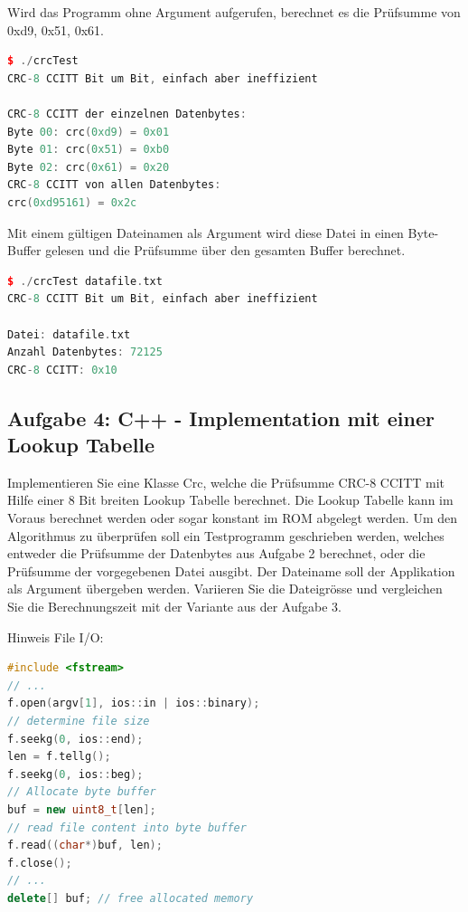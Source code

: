 Wird das Programm ohne Argument aufgerufen, berechnet es die Prüfsumme von {0xd9, 0x51, 0x61}.

\begin{lstlisting}[language=C++, style=C++]
$ ./crcTest
CRC-8 CCITT Bit um Bit, einfach aber ineffizient

CRC-8 CCITT der einzelnen Datenbytes:
Byte 00: crc(0xd9) = 0x01
Byte 01: crc(0x51) = 0xb0
Byte 02: crc(0x61) = 0x20
CRC-8 CCITT von allen Datenbytes:
crc(0xd95161) = 0x2c
\end{lstlisting}

Mit einem gültigen Dateinamen als Argument wird diese Datei in einen Byte-Buffer gelesen und die Prüfsumme über den gesamten Buffer berechnet.

\begin{lstlisting}[language=C++, style=C++]
$ ./crcTest datafile.txt
CRC-8 CCITT Bit um Bit, einfach aber ineffizient

Datei: datafile.txt
Anzahl Datenbytes: 72125
CRC-8 CCITT: 0x10
\end{lstlisting}


\noindent\makebox[\linewidth]{\rule{\paperwidth}{0.4pt}}

\noindent\makebox[\linewidth]{\rule{\paperwidth}{0.4pt}}


\subsection{Aufgabe 4: C++ - Implementation mit einer Lookup Tabelle}
Implementieren Sie eine Klasse Crc, welche die Prüfsumme CRC-8 CCITT mit Hilfe einer 8 Bit breiten Lookup Tabelle berechnet. Die Lookup Tabelle kann im Voraus berechnet werden oder sogar konstant im ROM abgelegt werden. Um den Algorithmus zu überprüfen soll ein Testprogramm geschrieben werden, welches entweder die Prüfsumme der Datenbytes aus Aufgabe 2 berechnet, oder die Prüfsumme der vorgegebenen Datei ausgibt. Der Dateiname soll der Applikation als Argument übergeben werden. Variieren Sie die Dateigrösse und vergleichen Sie die Berechnungszeit mit der Variante aus der Aufgabe 3.

\medskip

Hinweis File I/O:

\begin{lstlisting}[language=C++, style=C++]
#include <fstream>
// ...
f.open(argv[1], ios::in | ios::binary);
// determine file size
f.seekg(0, ios::end);
len = f.tellg();
f.seekg(0, ios::beg);
// Allocate byte buffer
buf = new uint8_t[len];
// read file content into byte buffer
f.read((char*)buf, len);
f.close();
// ...
delete[] buf; // free allocated memory
\end{lstlisting}

